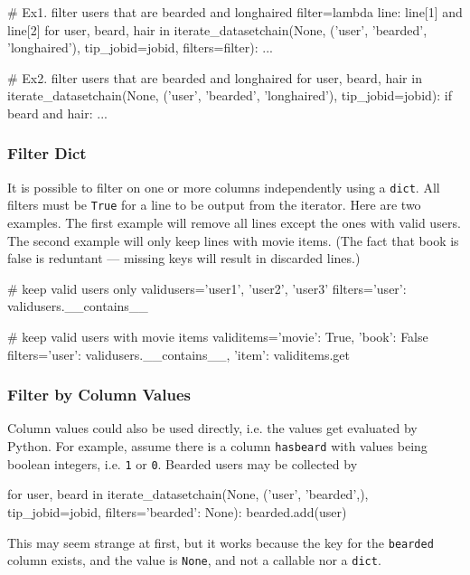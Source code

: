 \begin{python}
# Ex1.  filter users that are bearded and longhaired
filter=lambda line: line[1] and line[2]
for user, beard, hair in iterate_datasetchain(None, ('user', 'bearded', 'longhaired'),
                                       tip_jobid=jobid, filters=filter):
    ...

# Ex2.  filter users that are bearded and longhaired
for user, beard, hair in iterate_datasetchain(None, ('user', 'bearded', 'longhaired'),
                                       tip_jobid=jobid):
    if beard and hair:
        ...
\end{python}




\subsubsection*{Filter Dict}

It is possible to filter on one or more columns independently using a
\texttt{dict}.  All filters must be \texttt{True} for a line to be
output from the iterator.  Here are two examples.  The first example
will remove all lines except the ones with valid users.  The second
example will only keep lines with movie items.  (The fact that book is
false is reduntant --- missing keys will result in discarded lines.)

\begin{python}
# keep valid users only
validusers={'user1', 'user2', 'user3'}
filters={'user': validusers.__contains__}

# keep valid users with movie items
validitems={'movie': True, 'book': False}
filters={'user': validusers.__contains__, 'item': validitems.get}
\end{python}




\subsubsection*{Filter by Column Values}


Column values could also be used directly, i.e. the values get
evaluated by Python.  For example, assume there is a column
\texttt{hasbeard} with values being boolean integers, i.e.  \texttt{1}
or \texttt{0}.  Bearded users may be collected by
\begin{python}
for user, beard in iterate_datasetchain(None, ('user', 'bearded',), tip_jobid=jobid,
                                       filters={'bearded': None}):
    bearded.add(user)
\end{python}
\noindent This may seem strange at first, but it works because the key
for the \texttt{bearded} column exists, and the value is
\texttt{None}, and not a callable nor a \texttt{dict}.




